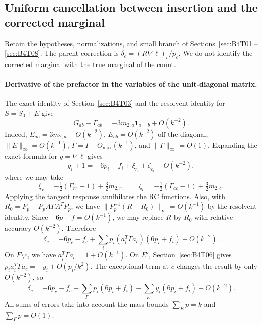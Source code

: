 \subsection{Uniform cancellation between insertion and the corrected marginal}\label{sec:B4T09}
Retain the hypotheses, normalizations, and small branch of Sections~\ref{sec:B4T01}--\ref{sec:B4T08}. The
parent correction is $\delta_c=(R\nabla\ell)_c/p_c$.
We do not identify the corrected marginal with the true marginal of the count.

\paragraph{Derivative of the prefactor in the variables of the unit-diagonal matrix.}
The exact identity of Section~\ref{sec:B4T03} and the resolvent identity for $S=S_0+E$ give
\[
 G_{ab}-\Gamma_{ab}=-3m_{2,a}\mathbf1_{a=b}+O(k^{-2}).
\]
Indeed, $E_{aa}=3m_{2,a}+O(k^{-2})$, $E_{ab}=O(k^{-2})$ off the diagonal, $\|E\|_\infty=O(k^{-1})$,
$\Gamma=I+O_{\max}(k^{-1})$, and $\|\Gamma\|_\infty=O(1)$.
Expanding the exact formula for $g=\nabla\ell$ gives
\[
 g_i+1=-6p_i-f_i+\xi_{r_i}+\zeta_{c_i}+O(k^{-2}),
\]
where we may take
\[
 \xi_r=-\tfrac12(\Gamma_{rr}-1)+\tfrac32m_{2,r},\qquad
 \zeta_c=-\tfrac12(\Gamma_{cc}-1)+\tfrac32m_{2,c}.
\]
Applying the tangent response annihilates the RC functions.
Also, with $R_0=P_p-P_pA\Gamma A^TP_p$, we have $\|P_p^{-1}(R-R_0)\|_\infty=O(k^{-1})$ by the resolvent
identity.
Since $-6p-f=O(k^{-1})$, we may replace $R$ by $R_0$ with relative accuracy $O(k^{-2})$. Therefore
\[
 \delta_c=-6p_c-f_c+
 \sum_i p_i(a_i^T\Gamma a_c)(6p_i+f_i)+O(k^{-2}).
\]
On $F\setminus c$, we have $a_i^T\Gamma a_c=1+O(k^{-1})$.
On $E'$, Section~\ref{sec:B4T06} gives $p_i a_i^T\Gamma a_c=-y_i+O(p_i/k^2)$.
The exceptional term at $c$ changes the result by only $O(k^{-2})$, so
\[
 \boxed{\delta_c=-6p_c-f_c+
 \sum_Fp_i(6p_i+f_i)-\sum_{E'}y_i(6p_i+f_i)+O(k^{-2}).}
\]
All sums of errors take into account the mass bounds $\sum_Ep=k$ and $\sum_Fp=O(1)$.

